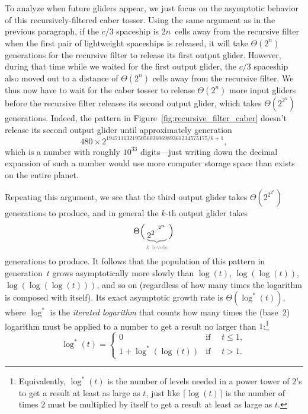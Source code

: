 To analyze when future gliders appear, we just focus on the asymptotic behavior of this recursively-filtered caber tosser. Using the same argument as in the previous paragraph, if the $c/3$ spaceship is $2n$~cells away from the recursive filter when the first pair of lightweight spaceships is released, it will take $\Theta(2^n)$ generations for the recursive filter to release its first output glider. However, during that time while we waited for the first output glider, the $c/3$ spaceship also moved out to a distance of $\Theta(2^n)$ cells away from the recursive filter. We thus now have to wait for the caber tosser to release $\Theta(2^n)$ more input gliders before the recursive filter releases its second output glider, which takes $\Theta(2^{2^n})$ generations. Indeed, the pattern in Figure~\ref{fig:recursive_filter_caber} doesn't release its second output glider until approximately generation
\[
	480 \times 2^{19471113219505603606989361234575175/6 + 1},
\]
which is a number with roughly $10^{33}$ digits---just writing down the decimal expansion of such a number would use more computer storage space than exists on the entire planet.

Repeating this argument, we see that the third output glider takes $\Theta(2^{2^{2^n}})$ generations to produce, and in general the $k$-th output glider takes
\[
	\raisebox{0.18cm}{$\displaystyle\Theta\Big($}\begingroup\color{gray}\underbrace{{\color{black}2^{2^{\cdot^{\cdot^{2^n}}}}}}_{\text{\color{gray}$k$ levels}}\endgroup\raisebox{0.18cm}{$\displaystyle\Big)$}
\]
generations to produce. It follows that the population of this pattern in generation~$t$ grows asymptotically more slowly than $\log(t)$, $\log(\log(t))$, $\log(\log(\log(t)))$, and so on (regardless of how many times the logarithm is composed with itself). Its exact asymptotic growth rate is $\Theta(\log^*(t))$, where $\log^*$ is the \emph{iterated logarithm} that counts how many times the (base~$2$) logarithm must be applied to a number to get a result no larger than $1$:\footnote{Equivalently, $\log^*(t)$ is the number of levels needed in a power tower of $2$'s to get a result at least as large as $t$, just like $\lceil\log(t)\rceil$ is the number of times $2$ must be multiplied by itself to get a result at least as large as $t$.}
\[
	\log^*(t) =
	\begin{cases}
		0                  & \mbox{if } \quad t \leq 1, \\
		1 + \log^*(\log(t)) & \mbox{if } \quad t > 1.
	\end{cases}
\]

